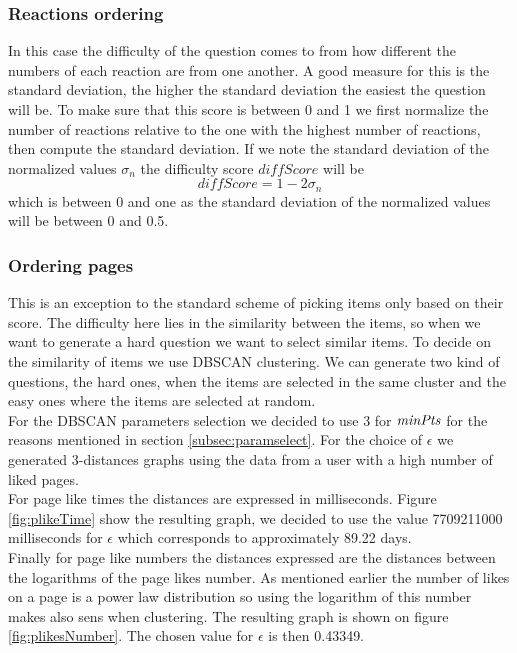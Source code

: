 \subsubsection{Reactions ordering}
In this case the difficulty of the question comes to from how different the numbers of each reaction are from one another. A good measure for this is the standard deviation, the higher the standard deviation the easiest the question will be. To make sure that this score is between 0 and 1 we first normalize the number of reactions relative to the one with the highest number of reactions, then compute the standard deviation. If we note the standard deviation of the normalized values $\sigma_n$ the difficulty score $\mathit{diffScore}$ will be $$\mathit{diffScore} = 1 - 2 \sigma_n$$ which is between 0 and one as the standard deviation of the normalized values will be between 0 and 0.5.
\subsubsection{Ordering pages}\label{subsubsec:orderpages}
This is an exception to the standard scheme of picking items only based on their score. The difficulty here lies in the similarity between the items, so when we want to generate a hard question we want to select similar items. To decide on the similarity of items we use DBSCAN clustering. We can generate two kind of questions, the hard ones, when the items are selected in the same cluster and the easy ones where the items are selected at random.\\
For the DBSCAN parameters selection we decided to use 3 for $\mathit{minPts}$ for the reasons mentioned in section \ref{subsec:paramselect}. For the choice of $\epsilon$ we generated 3-distances graphs using the data from a user with a high number of liked pages.\\
For page like times the distances are expressed in milliseconds. Figure \ref{fig:plikeTime} show the resulting graph, we decided to use the value 7709211000 milliseconds for $\epsilon$ which corresponds to approximately 89.22 days.\\
Finally for page like numbers the distances expressed are the distances between the logarithms of the page likes number. As mentioned earlier the number of likes on a page is a power law distribution so using the logarithm of this number makes also sens when clustering. The resulting graph is shown on figure \ref{fig:plikesNumber}. The chosen value for $\epsilon$ is then 0.43349.

